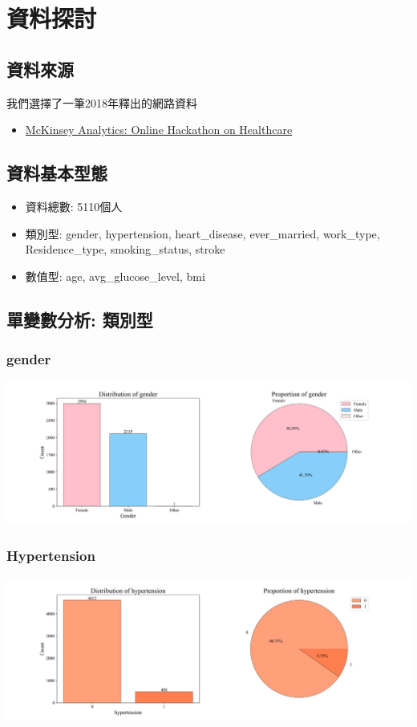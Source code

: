 \chapter{資料探討}
\section{資料來源}
我們選擇了一筆2018年釋出的網路資料
\begin{itemize}
    \item \href{https://datahack.analyticsvidhya.com/contest/mckinsey-analytics-online-hackathon/}{McKinsey Analytics: Online Hackathon on Healthcare}
\end{itemize}

\section{資料基本型態}
\begin{itemize}
    \item 資料總數: 5110個人
    \item 類別型: gender, hypertension, heart\_disease, ever\_married, work\_type, Residence\_type, smoking\_status, stroke
    \item 數值型: age, avg\_glucose\_level, bmi
\end{itemize}

\section{單變數分析: 類別型}
\subsection{gender}
\includegraphics[width=13.5cm]{./images/gender_bar_pie.png}

\subsection{Hypertension}
\includegraphics[width=13.5cm]{./images/hypert_bar_pie.png}

